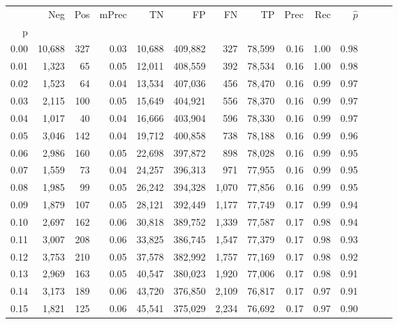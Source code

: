 \begin{tabular}{rrrrrrrrrrrrrr}
\toprule
{} &     Neg &    Pos & mPrec &       TN &       FP &      FN &      TP &  Prec &   Rec & $\hat{p}$ \\
p    &         &        &       &          &          &         &         &       &       &           \\
\midrule
0.00 &  10,688 &    327 &  0.03 &   10,688 &  409,882 &     327 &  78,599 &  0.16 &  1.00 &      0.98 \\
0.01 &   1,323 &     65 &  0.05 &   12,011 &  408,559 &     392 &  78,534 &  0.16 &  1.00 &      0.98 \\
0.02 &   1,523 &     64 &  0.04 &   13,534 &  407,036 &     456 &  78,470 &  0.16 &  0.99 &      0.97 \\
0.03 &   2,115 &    100 &  0.05 &   15,649 &  404,921 &     556 &  78,370 &  0.16 &  0.99 &      0.97 \\
0.04 &   1,017 &     40 &  0.04 &   16,666 &  403,904 &     596 &  78,330 &  0.16 &  0.99 &      0.97 \\
0.05 &   3,046 &    142 &  0.04 &   19,712 &  400,858 &     738 &  78,188 &  0.16 &  0.99 &      0.96 \\
0.06 &   2,986 &    160 &  0.05 &   22,698 &  397,872 &     898 &  78,028 &  0.16 &  0.99 &      0.95 \\
0.07 &   1,559 &     73 &  0.04 &   24,257 &  396,313 &     971 &  77,955 &  0.16 &  0.99 &      0.95 \\
0.08 &   1,985 &     99 &  0.05 &   26,242 &  394,328 &   1,070 &  77,856 &  0.16 &  0.99 &      0.95 \\
0.09 &   1,879 &    107 &  0.05 &   28,121 &  392,449 &   1,177 &  77,749 &  0.17 &  0.99 &      0.94 \\
0.10 &   2,697 &    162 &  0.06 &   30,818 &  389,752 &   1,339 &  77,587 &  0.17 &  0.98 &      0.94 \\
0.11 &   3,007 &    208 &  0.06 &   33,825 &  386,745 &   1,547 &  77,379 &  0.17 &  0.98 &      0.93 \\
0.12 &   3,753 &    210 &  0.05 &   37,578 &  382,992 &   1,757 &  77,169 &  0.17 &  0.98 &      0.92 \\
0.13 &   2,969 &    163 &  0.05 &   40,547 &  380,023 &   1,920 &  77,006 &  0.17 &  0.98 &      0.91 \\
0.14 &   3,173 &    189 &  0.06 &   43,720 &  376,850 &   2,109 &  76,817 &  0.17 &  0.97 &      0.91 \\
0.15 &   1,821 &    125 &  0.06 &   45,541 &  375,029 &   2,234 &  76,692 &  0.17 &  0.97 &      0.90 \\

\end{tabular}
